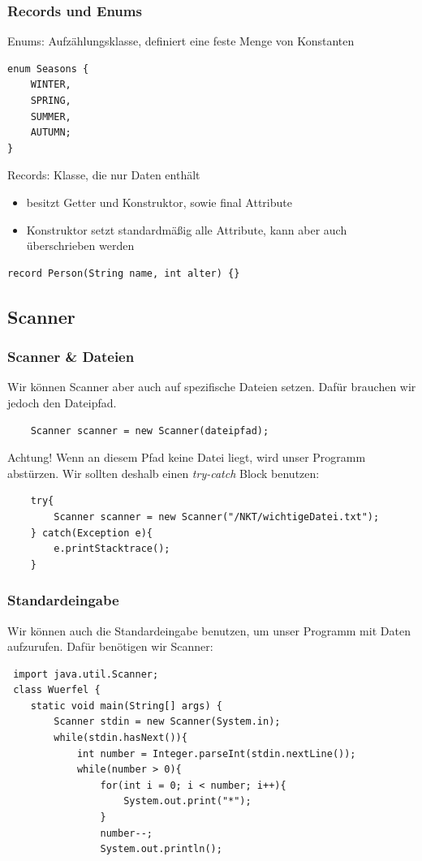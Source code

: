 \begin{frame}[fragile]
\frametitle{Records und Enums}
Enums:  Aufzählungsklasse, definiert eine feste Menge von Konstanten
\begin{lstlisting}
enum Seasons {
    WINTER,
    SPRING,
    SUMMER,
    AUTUMN;
}
\end{lstlisting}
Records:  Klasse, die nur Daten enthält
\begin{itemize}
    \item besitzt Getter und Konstruktor, sowie final Attribute
    \item Konstruktor setzt standardmäßig alle Attribute, kann aber auch überschrieben werden
\end{itemize}
\begin{lstlisting}
record Person(String name, int alter) {}
\end{lstlisting}
\end{frame}

\subsection{Scanner}
\begin{frame}[fragile]
\frametitle{Scanner \& Dateien}
Wir können Scanner aber auch auf spezifische Dateien setzen. Dafür brauchen wir jedoch den Dateipfad.
\begin{lstlisting}
    Scanner scanner = new Scanner(dateipfad);
\end{lstlisting}
Achtung! Wenn an diesem Pfad keine Datei liegt, wird unser Programm abstürzen. Wir sollten deshalb einen \textit{try-catch} Block benutzen:
\begin{lstlisting}
    try{
        Scanner scanner = new Scanner("/NKT/wichtigeDatei.txt");
    } catch(Exception e){
        e.printStacktrace();
    }
\end{lstlisting}
\end{frame}

\begin{frame}[fragile]
\frametitle{Standardeingabe}
Wir können auch die Standardeingabe benutzen, um unser Programm mit Daten aufzurufen.
Dafür benötigen wir Scanner:
\begin{lstlisting}
 import java.util.Scanner;
 class Wuerfel {
    static void main(String[] args) {
        Scanner stdin = new Scanner(System.in);
        while(stdin.hasNext()){
            int number = Integer.parseInt(stdin.nextLine());
            while(number > 0){
                for(int i = 0; i < number; i++){
                    System.out.print("*");
                }
                number--;
                System.out.println();
\end{lstlisting}    
\end{frame}

